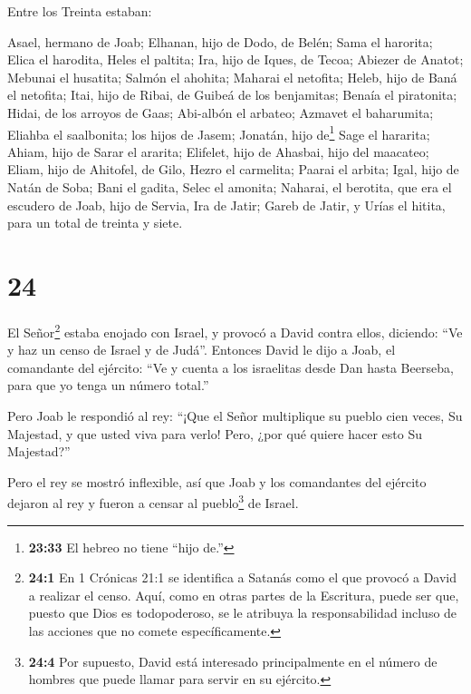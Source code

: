  Entre los Treinta estaban:

Asael, hermano de Joab; Elhanan, hijo de Dodo, de Belén; 
Sama el harorita; Elica el harodita,  Heles el paltita;
Ira, hijo de Iques, de Tecoa;  Abiezer de Anatot; Mebunai
el husatita;  Salmón el ahohita; Maharai el netofita;
 Heleb, hijo de Baná el netofita; Itai, hijo de Ribai, de
Guibeá de los benjamitas;  Benaía el piratonita; Hidai, de
los arroyos de Gaas;  Abi-albón el arbateo; Azmavet el
baharumita;  Eliahba el saalbonita; los hijos de Jasem;
Jonatán,  hijo de\footnote{\textbf{23:33} El hebreo no
  tiene ``hijo de.''} Sage el hararita; Ahiam, hijo de Sarar el ararita;
 Elifelet, hijo de Ahasbai, hijo del maacateo; Eliam, hijo
de Ahitofel, de Gilo,  Hezro el carmelita; Paarai el
arbita;  Igal, hijo de Natán de Soba; Bani el gadita,
 Selec el amonita; Naharai, el berotita, que era el
escudero de Joab, hijo de Servia,  Ira de Jatir; Gareb de
Jatir,  y Urías el hitita, para un total de treinta y
siete.

\hypertarget{section-23}{%
\section{24}\label{section-23}}

 El Señor\footnote{\textbf{24:1} En 1 Crónicas 21:1 se
  identifica a Satanás como el que provocó a David a realizar el censo.
  Aquí, como en otras partes de la Escritura, puede ser que, puesto que
  Dios es todopoderoso, se le atribuya la responsabilidad incluso de las
  acciones que no comete específicamente.} estaba enojado con Israel, y
provocó a David contra ellos, diciendo: ``Ve y haz un censo de Israel y
de Judá''.  Entonces David le dijo a Joab, el comandante del
ejército: ``Ve y cuenta a los israelitas desde Dan hasta Beerseba, para
que yo tenga un número total.''

 Pero Joab le respondió al rey: ``¡Que el Señor multiplique
su pueblo cien veces, Su Majestad, y que usted viva para verlo! Pero,
¿por qué quiere hacer esto Su Majestad?''

 Pero el rey se mostró inflexible, así que Joab y los
comandantes del ejército dejaron al rey y fueron a censar al
pueblo\footnote{\textbf{24:4} Por supuesto, David está interesado
  principalmente en el número de hombres que puede llamar para servir en
  su ejército.} de Israel.

